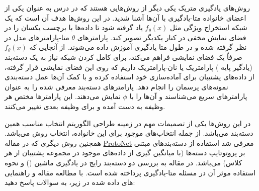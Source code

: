 \documentclass{article}
\begin{document}
روش‌های یادگیری متریک یکی دیگر از روش‌هایی هستند که در درس به عنوان یکی از اعضای خانواده متا-یادگیری با آن‌ها آشنا شدید. در این روش‌ها هدف آن است که یک شبکه استخراج ویژگی مثل
$f_\theta(x)$
یاد گرفته شود تا داده‌ها با برچسب یکسان را در فضای نمایش مخفی در کنار یکدیگر تصویر کند. پارامترهای 
$\theta$
متا-پارامترهای مدل در نظر گرفته شده و در طول متا-یادگیری آموزش داده می‌شوند. از آنجایی که 
$f_\theta(x)$
صرفاً یک فضای نمایشی 
 فراهم می‌کند، برای کامل کردن شبکه نیاز به یک دسته‌بند (یادگیر پایه
) پارامتریک یا نان-پارامتریک داریم که روی این فضای نمایشی قرار گرفته، از داده‌های پشتیبان برای آماده‌سازی خود استفاده کرده و با کمک آن‌ها عمل دسته‌بندی نمونه‌های پرسمان را انجام دهد. پارامترهای دسته‌بند معرفی شده را به عنوان پارامترهای سریع می‌شناسند و آن‌ها را با 
$\phi$
نمایش می‌دهند. این پارامترها مختص هر وظیفه به دست آمده و برای وظیفه بعدی تغییر می‌کنند.

در این روش‌ها یکی از تصمیمات مهم در زمینه طراحی الگوریتم انتخاب مناسب همین دسته‌بند می‌باشد. از جمله انتخاب‌های موجود برای این خانواده، انتخاب روش  
می‌باشد. همچنین روش دیگری که در مقاله 
\href{https://arxiv.org/abs/1703.05175}{ProtoNet}
 معرفی شد استفاده از دسته‌بندهای مبتنی بر پروتوتایپ دسته‌ها (با میانگین گیری از داده‌های موجود در مجموعه پشتیبان از هر کلاس) می‌باشد.  در مقاله
به بررسی دو دسته‌بند رایج در یادگیری ماشین () و نحوه استفاده موثر آن در مسئله متا-یادگیری پرداخته شده است. با مطالعه مقاله و راهنمایی های داده‌ شده در زیر،‌ به سوالات پاسخ دهید:
\end{document}
